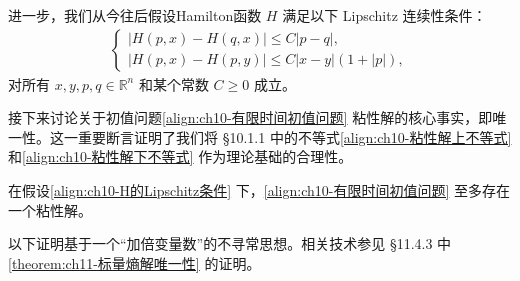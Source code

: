 \documentclass[../../main.tex]{subfiles}
\begin{document}
进一步，我们从今往后假设Hamilton函数 $H$ 满足以下 Lipschitz 连续性条件：
\begin{align}
\begin{cases}
|H(p,x)-H(q,x)|\leqslant C|p-q|,\\
|H(p,x)-H(p,y)|\leqslant C|x-y|(1+|p|),
\end{cases}
\label{align:ch10-H的Lipschitz条件}
\end{align}
对所有 $x,y,p,q\in\mathbb{R}^n$ 和某个常数 $C\geqslant 0$ 成立。

接下来讨论关于初值问题\eqref{align:ch10-有限时间初值问题} 粘性解的核心事实，即唯一性。这一重要断言证明了我们将 \S10.1.1 中的不等式\eqref{align:ch10-粘性解上不等式} 和\eqref{align:ch10-粘性解下不等式} 作为理论基础的合理性。

\begin{theorem}[粘性解的唯一性。]\label{theorem:ch10-粘性解唯一性}在假设\eqref{align:ch10-H的Lipschitz条件} 下，\eqref{align:ch10-有限时间初值问题} 至多存在一个粘性解。

以下证明基于一个``加倍变量数''的不寻常思想。相关技术参见 \S11.4.3 中\cref{theorem:ch11-标量熵解唯一性} 的证明。
\end{theorem}
\end{document}
